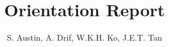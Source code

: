 \documentclass[a4paper]{report}
\begin{document}
\title{Orientation Report}
\author{ S. Austin, A. Drif, W.K.H. Ko, J.E.T. Tan}
\date{}

\maketitle


\end{document}
